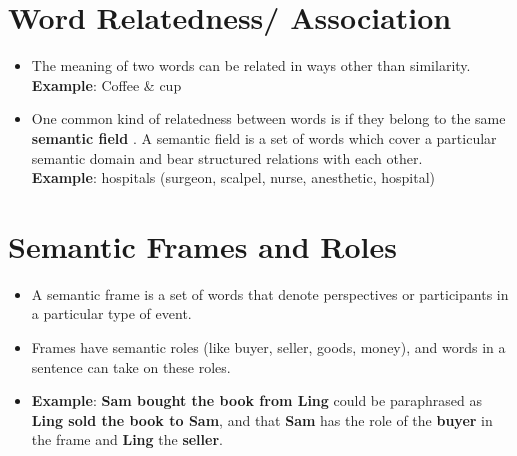 \section{Word Relatedness/ Association \cite{nlp-1}}\label{Word Relatedness/ Association}
\begin{itemize}
    \item The meaning of two words can be related in ways other than similarity.\\
    \textbf{Example}: Coffee \& cup

    \item One common kind of relatedness between words is if they belong to the same \textbf{semantic field} \label{semantic field}. A semantic field is a set of words which cover a particular semantic domain and bear structured relations with each other.\\
    \textbf{Example}: hospitals (surgeon, scalpel, nurse, anesthetic, hospital)

\end{itemize}

\section{Semantic Frames and Roles \cite{nlp-1}} \label{Semantic Frames and Roles}
\begin{itemize}
    \item A semantic frame is a set of words that denote perspectives or participants in a particular type of event.

    \item Frames have semantic roles (like buyer, seller, goods, money), and words in a sentence can take on these roles.

    \item \textbf{Example}: \textbf{Sam bought the book from Ling} could be paraphrased as \textbf{Ling sold the book to Sam}, and that \textbf{Sam} has the role of the \textbf{buyer} in the frame and \textbf{Ling} the \textbf{seller}.
\end{itemize}

